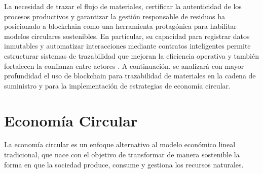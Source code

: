 La necesidad de trazar el flujo de materiales, certificar la autenticidad de los procesos productivos y garantizar la gestión responsable de residuos ha posicionado a blockchain como una herramienta protagónica para habilitar modelos circulares sostenibles. En particular, su capacidad para registrar datos inmutables y automatizar interacciones mediante contratos inteligentes permite estructurar sistemas de trazabilidad que mejoran la eficiencia operativa y también fortalecen la confianza entre actores \cite{sharabati2024blockchain, rejeb2023role}. A continuación, se analizará con mayor profundidad el uso de blockchain para trazabilidad de materiales en la cadena de suministro y para la implementación de estrategias de economía circular.

\section{Economía Circular}
\label{sec:circular-economy}

La economía circular es un enfoque alternativo al modelo económico lineal tradicional, que nace con el objetivo de transformar de manera sostenible la forma en que la sociedad produce, consume y gestiona los recursos naturales.

